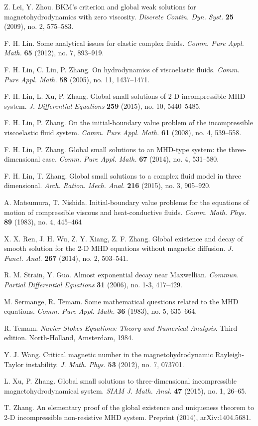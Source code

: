 \documentclass[a4paper,reqno,11pt]{amsart}
\numberwithin{equation}{section}
\begin{document}
\begin{thebibliography}{99}
Z. Lei, Y. Zhou. BKM's criterion and global weak solutions for magnetohydrodynamics with zero viscosity. \emph{Discrete Contin. Dyn. Syst.} \textbf{25} (2009), no. 2, 575--583.

F. H. Lin. Some analytical issues for elastic complex fluids. \emph{Comm. Pure Appl. Math.} \textbf{65}  (2012),  no. 7, 893--919.

F. H. Lin, C. Liu, P. Zhang. On hydrodynamics of viscoelastic fluids. \emph{Comm. Pure Appl. Math.} \textbf{58} (2005),  no. 11, 1437--1471.

F. H. Lin, L. Xu, P. Zhang. Global small solutions of 2-D incompressible MHD system. \emph{J. Differential Equations} \textbf{259} (2015),  no. 10, 5440--5485.

F. H. Lin, P. Zhang. On the initial-boundary value problem of the incompressible viscoelastic fluid system. \emph{Comm. Pure Appl. Math.} \textbf{61}  (2008),  no. 4, 539--558.

F. H. Lin, P. Zhang. Global small solutions to an MHD-type system: the three-dimensional case. \emph{Comm. Pure Appl. Math.} \textbf{67} (2014),  no. 4, 531--580.

F. H. Lin, T. Zhang. Global small solutions to a complex fluid model in three dimensional. \emph{Arch. Ration. Mech. Anal.} \textbf{216} (2015),  no. 3, 905--920.

 A. Matsumura, T. Nishida. Initial-boundary value problems for the equations of motion of compressible viscous and heat-conductive fluids. \emph{Comm. Math. Phys.} \textbf{89} (1983), no. 4, 445--464

X. X. Ren, J. H. Wu, Z. Y. Xiang, Z. F. Zhang. Global existence and decay of smooth solution for the 2-D MHD equations without magnetic diffusion. \emph{J. Funct. Anal.} \textbf{267} (2014), no. 2, 503--541.

R. M. Strain, Y. Guo. Almost exponential decay near Maxwellian. \emph{Commun. Partial
Differential Equations} \textbf{31} (2006), no. 1-3, 417--429.

M. Sermange, R. Temam. Some mathematical questions related to the MHD equations. \emph{Comm. Pure Appl. Math.} \textbf{36} (1983), no. 5, 635--664.

R. Temam. \emph{Navier-Stokes Equations: Theory and Numerical Analysis}. Third edition. North-Holland, Amsterdam, 1984.

Y. J. Wang. Critical magnetic number in the magnetohydrodynamic Rayleigh-Taylor instability. \emph{J. Math. Phys.} \textbf{53} (2012),  no. 7, 073701.

L. Xu, P. Zhang. Global small solutions to three-dimensional incompressible magnetohydrodynamical system. \emph{SIAM J. Math. Anal.} \textbf{47} (2015),  no. 1, 26--65.

T. Zhang. An elementary proof of the global existence and uniqueness theorem to 2-D incompressible non-resistive MHD system. Preprint (2014), arXiv:1404.5681.
\end{thebibliography}

    
\end{document}
